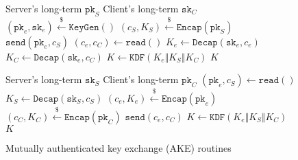\documentclass[journal=tches,submission]{iacrtrans}
\newcommand{\keygen}{\texttt{KeyGen}}
\newcommand{\encap}{\texttt{Encap}}
\newcommand{\decap}{\texttt{Decap}}
\newcommand{\pk}{\texttt{pk}}
\newcommand{\sk}{\texttt{sk}}
\newcommand{\leftsample}{\stackrel{\$}{\leftarrow}}
\begin{document}
\begin{figure}[H]
    \centering
    \begin{minipage}[b]{0.49\textwidth}
        \begin{algorithm}[H]
            \caption*{$\texttt{AKE}_\texttt{C}(\pk_S, \sk_C)$}
            \begin{algorithmic}[1]
                \Require Server's long-term $\pk_S$
                \Require Client's long-term $\sk_C$
                \State $(\pk_e, \sk_e) \leftsample \keygen()$
                \State $(c_S, K_S) \leftsample \encap(\pk_S)$
                \State $\texttt{send}(\pk_e, c_S)$
                \State $(c_e, c_C) \leftarrow \texttt{read}()$
                \State $K_e \leftarrow \decap(\sk_e, c_e)$
                \State $K_C \leftarrow \decap(\sk_e, c_C)$
                \State $K \leftarrow \texttt{KDF}(K_e \Vert K_S \Vert K_C)$
                \State \Return $K$
            \end{algorithmic}
        \end{algorithm}
    \end{minipage}
    \begin{minipage}[b]{0.49\textwidth}
        \begin{algorithm}[H]
            \caption*{$\texttt{AKE}_\texttt{S}(\sk_S, \pk_C)$}
            \begin{algorithmic}[1]
                \Require Server's long-term $\sk_S$
                \Require Client's long-term $\pk_C$
                \State $(\pk_e, c_S) \leftarrow \texttt{read}()$
                \State $K_S \leftarrow \decap(\sk_S, c_S)$
                \State $(c_e, K_e) \leftsample \encap(\pk_e)$
                \State $(c_C, K_C) \leftsample \encap(\pk_C)$
                \State $\texttt{send}(c_e, c_C)$
                \State $K \leftarrow \texttt{KDF}(K_e \Vert K_S \Vert K_C)$
                \State \Return $K$
            \end{algorithmic}
        \end{algorithm}
    \end{minipage}
    
    \caption{Mutually authenticated key exchange (AKE) routines}\label{fig:ake-routines}
\end{figure}
\end{document}
